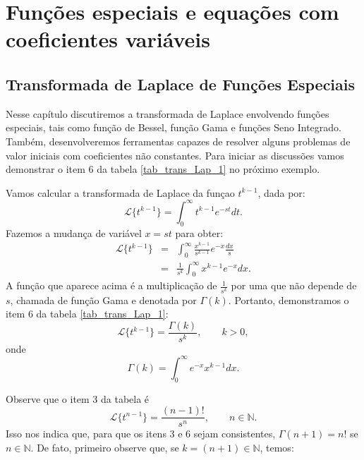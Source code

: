 \chapter{Funções especiais e equações com coeficientes variáveis}
\section{Transformada de Laplace de Funções Especiais}
Nesse capítulo discutiremos a transformada de Laplace envolvendo funções especiais, tais como função de Bessel, função Gama e funções Seno Integrado. Também, desenvolveremos ferramentas capazes de resolver alguns problemas de valor iniciais com coeficientes não constantes.
Para iniciar as discussões vamos demonstrar o item 6 da tabela \ref{tab_trans_Lap_1} no próximo exemplo.
\begin{ex}Vamos calcular a transformada de Laplace da funçao $t^{k-1}$, dada por:
\begin{equation}
\mathcal{L}\{t^{k-1} \}=\int_0^\infty t^{k-1} e^{-st}dt.
\end{equation}
Fazemos a mudança de variável $x=st$ para obter:
\begin{eqnarray*}
 \mathcal{L}\{t^{k-1} \}&=&\int_0^\infty \frac{x^{k-1}}{s^{k-1}}e^{-x}\frac{dx}{s}\\
 &=&\frac{1}{s^k}\int_0^\infty x^{k-1}e^{-x} dx.
 \end{eqnarray*}
A função que aparece acima é a multiplicação de $\frac{1}{s^k}$ por uma que não depende de $s$, chamada de função Gama e denotada por $\Gamma(k)$. Portanto, demonstramos o item 6 da tabela \ref{tab_trans_Lap_1}:
\begin{equation}
\mathcal{L}\{t^{k-1} \}=\frac{\Gamma(k)}{s^k},\qquad k>0,
\end{equation}
onde
\begin{equation}
\Gamma(k)=\int_0^\infty e^{-x}x^{k-1}dx.
\end{equation}
\end{ex}
Observe que o item 3 da tabela é
\begin{equation}
\mathcal{L}\{t^{n-1}\}=\frac{(n-1)!}{s^n}, \qquad n\in \mathbb{N}.
\end{equation}
Isso nos indica que, para que os itens 3 e 6 sejam consistentes, $\Gamma(n+1)=n!$ se $n\in\mathbb{N}$. De fato, primeiro observe que, se $k=(n+1)\in\mathbb{N}$, temos:
